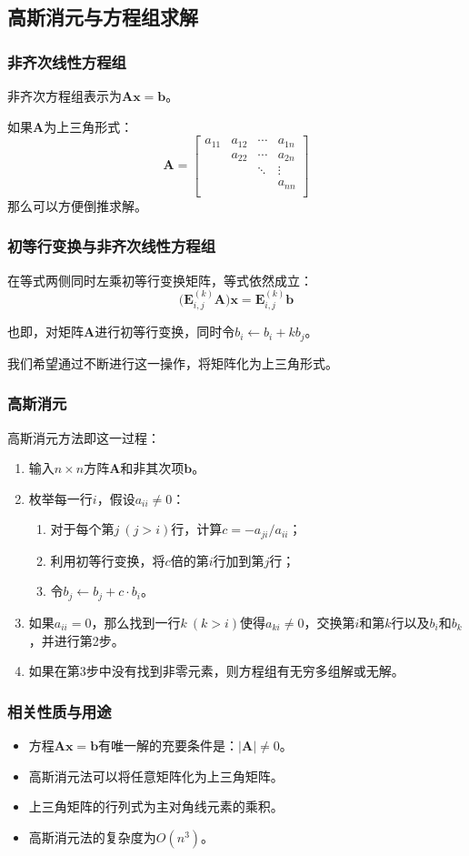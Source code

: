 \documentclass[9pt,dvipsnames]{beamer}
\renewcommand{\det}[1]{\vert{#1}\vert}
\begin{document}
\subsection{高斯消元与方程组求解}
\begin{frame}
	\frametitle{非齐次线性方程组}
	非齐次方程组表示为$\mathbf{Ax}=\mathbf{b}$。

	如果$\mathbf{A}$为上三角形式：
	\[ \mathbf{A} = \left[\begin{matrix}
		a_{11} & a_{12} & \cdots & a_{1n} \\
			   & a_{22} & \cdots & a_{2n} \\
			   &        & \ddots & \vdots \\
			   &        &        & a_{nn} \\
	\end{matrix}\right] \]
	那么可以方便倒推求解。
\end{frame}
\begin{frame}
	\frametitle{初等行变换与非齐次线性方程组}
	在等式两侧同时左乘初等行变换矩阵，等式依然成立：
	\[ \big(\mathbf{E}_{i,j}^{(k)}\mathbf{A}\big)\mathbf{x}=\mathbf{E}_{i,j}^{(k)}\mathbf{b} \]

	也即，对矩阵$\mathbf{A}$进行初等行变换，同时令$b_i\leftarrow b_i+k b_j$。

	我们希望通过不断进行这一操作，将矩阵化为上三角形式。
\end{frame}
\begin{frame}
	\frametitle{高斯消元}
	高斯消元方法即这一过程：
	\begin{enumerate}
		\item 输入$n\times n$方阵$\mathbf{A}$和非其次项$\mathbf{b}$。
		\item 枚举每一行$i$，假设$a_{ii}\neq 0$：
			\begin{enumerate}
				\item 对于每个第$j\ (j>i)$行，计算$c=-a_{ji}/a_{ii}$；
				\item 利用初等行变换，将$c$倍的第$i$行加到第$j$行；
				\item 令$b_j\leftarrow b_j+c\cdot b_i$。
			\end{enumerate}
		\item 如果$a_{ii}=0$，那么找到一行$k\ (k>i)$使得$a_{ki}\neq 0$，交换第$i$和第$k$行以及$b_i$和$b_k$，并进行第2步。
		\item 如果在第3步中没有找到非零元素，则方程组有无穷多组解或无解。
	\end{enumerate}
\end{frame}
\begin{frame}
	\frametitle{相关性质与用途}
	\begin{itemize}
		\item 方程$\mathbf{Ax}=\mathbf{b}$有唯一解的充要条件是：$\det{\mathbf{A}}\neq 0$。
		\item 高斯消元法可以将任意矩阵化为上三角矩阵。
		\item 上三角矩阵的行列式为主对角线元素的乘积。
		\item 高斯消元法的复杂度为$O(n^3)$。
	\end{itemize}
\end{frame}
\end{document}
